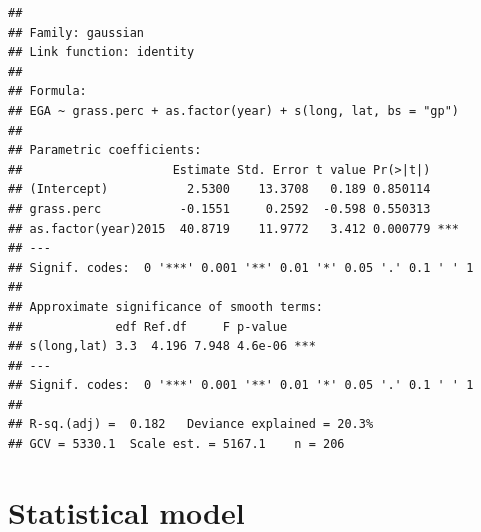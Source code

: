 \documentclass[
]{book}
\begin{document}
\begin{verbatim}
## 
## Family: gaussian 
## Link function: identity 
## 
## Formula:
## EGA ~ grass.perc + as.factor(year) + s(long, lat, bs = "gp")
## 
## Parametric coefficients:
##                     Estimate Std. Error t value Pr(>|t|)    
## (Intercept)           2.5300    13.3708   0.189 0.850114    
## grass.perc           -0.1551     0.2592  -0.598 0.550313    
## as.factor(year)2015  40.8719    11.9772   3.412 0.000779 ***
## ---
## Signif. codes:  0 '***' 0.001 '**' 0.01 '*' 0.05 '.' 0.1 ' ' 1
## 
## Approximate significance of smooth terms:
##             edf Ref.df     F p-value    
## s(long,lat) 3.3  4.196 7.948 4.6e-06 ***
## ---
## Signif. codes:  0 '***' 0.001 '**' 0.01 '*' 0.05 '.' 0.1 ' ' 1
## 
## R-sq.(adj) =  0.182   Deviance explained = 20.3%
## GCV = 5330.1  Scale est. = 5167.1    n = 206
\end{verbatim}

\hypertarget{statistical-model}{%
\chapter{Statistical model}\label{statistical-model}}
\end{document}
